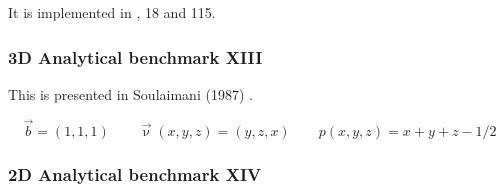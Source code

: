 It is implemented in , 18 and 115.



\subsubsection{3D Analytical benchmark XIII}\label{ss:sofo87_3D}

This is presented in Soulaimani \etal (1987) \cite{sofo87}. 

\[
\vec{b} = (1,1,1)
\qquad
\vec{\upnu}(x,y,z)=(y,z,x)
\qquad
p(x,y,z)=x+y+z-1/2
\]

\subsubsection{2D Analytical benchmark XIV\label{ss:mmsjolm17}}


